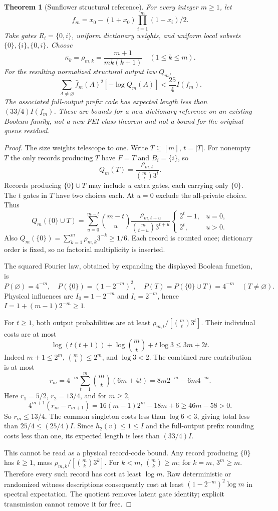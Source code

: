 \documentclass{article}
\newtheorem{theorem}{Theorem}
\begin{document}
\begin{theorem}[Sunflower structural reference]
For every integer $m\ge1$, let
\[
 f_m=x_0-(1+x_0)\prod_{i=1}^m(1-x_i)/2.
\]
Take gates $R_i=\{0,i\}$, uniform dictionary weights, and uniform local subsets $\{0\},\{i\},\{0,i\}$. Choose
\[
 \kappa_k=\rho_{m,k}=\frac{m+1}{m k(k+1)}\quad(1\le k\le m).
\]
For the resulting normalized structural output law $Q_m$,
\[
 \sum_{A\ne\varnothing}\widehat f_m(A)^2[-\log Q_m(A)]
 <\frac{25}{4}I(f_m).
\]
The associated full-output prefix code has expected length less than $(33/4)I(f_m)$. These are bounds for a new dictionary reference on an existing Boolean family, not a new FEI class theorem and not a bound for the original queue residual.
\end{theorem}
\begin{proof}
The size weights telescope to one. Write $T\subseteq[m]$, $t=|T|$. For nonempty $T$ the only records producing $T$ have $F=T$ and $B_i=\{i\}$, so
\[
 Q_m(T)=\frac{\rho_{m,t}}{\binom mt3^t}.
\]
Records producing $\{0\}\cup T$ may include $u$ extra gates, each carrying only $\{0\}$. The $t$ gates in $T$ have two choices each. At $u=0$ exclude the all-private choice. Thus
\[
 Q_m(\{0\}\cup T)=\sum_{u=0}^{m-t}\binom{m-t}{u}
 \frac{\rho_{m,t+u}}{\binom m{t+u}3^{t+u}}
 \begin{cases}2^t-1,&u=0,\\2^t,&u>0.\end{cases}
\]
Also $Q_m(\{0\})=\sum_{k=1}^m\rho_{m,k}3^{-k}\ge1/6$. Each record is counted once; dictionary order is fixed, so no factorial multiplicity is inserted.

The squared Fourier law, obtained by expanding the displayed Boolean function, is
\[
 P(\varnothing)=4^{-m},\quad P(\{0\})=(1-2^{-m})^2,
 \quad P(T)=P(\{0\}\cup T)=4^{-m}\quad(T\ne\varnothing).
\]
Physical influences are $I_0=1-2^{-m}$ and $I_i=2^{-m}$, hence $I=1+(m-1)2^{-m}\ge1$.

For $t\ge1$, both output probabilities are at least $\rho_{m,t}/[\binom mt3^t]$. Their individual costs are at most
\[
 \log(t(t+1))+\log\binom mt+t\log3\le3m+2t.
\]
Indeed $m+1\le2^m$, $\binom mt\le2^m$, and $\log3<2$. The combined rare contribution is at most
\[
 r_m=4^{-m}\sum_{t=1}^m\binom mt(6m+4t)
      =8m2^{-m}-6m4^{-m}.
\]
Here $r_1=5/2$, $r_2=13/4$, and for $m\ge2$,
\[
 4^{m+1}(r_m-r_{m+1})=16(m-1)2^m-18m+6
 \ge46m-58>0.
\]
So $r_m\le13/4$. The common singleton costs less than $\log6<3$, giving total less than $25/4\le(25/4)I$. Since $h_2(v)\le1\le I$ and the full-output prefix rounding costs less than one, its expected length is less than $(33/4)I$.

This cannot be read as a physical record-code bound. Any record producing $\{0\}$ has $k\ge1$, mass $\rho_{m,k}/[\binom mk3^k]$. For $k<m$, $\binom mk\ge m$; for $k=m$, $3^m\ge m$. Therefore every such record has cost at least $\log m$. Raw deterministic or randomized witness descriptions consequently cost at least $(1-2^{-m})^2\log m$ in spectral expectation. The quotient removes latent gate identity; explicit transmission cannot remove it for free.
\end{proof}
\end{document}

